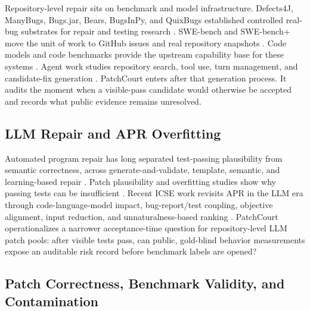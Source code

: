 \documentclass[conference]{IEEEtran}
\newcommand{\patchcourt}{PatchCourt\xspace}
\begin{document}
Repository-level repair sits on benchmark and model infrastructure.
Defects4J, ManyBugs, Bugs.jar, Bears, BugsInPy, and QuixBugs established controlled real-bug substrates for repair and testing research \cite{just2014defects4j,le2015manybugs,saha2018bugsjar,madeiral2019bears,widyasari2020bugsinpy,lin2017quixbugs}.
SWE-bench and SWE-bench+ move the unit of work to GitHub issues and real repository snapshots \cite{jimenez2024swebench,aleithan2024swebenchplus}.
Code models and code benchmarks provide the upstream capability base for these systems \cite{feng2020codebert,lu2021codexglue,chen2021codex,austin2021program,wang2021codet5,li2022alphacode,nijkamp2023codegen,roziere2023codellama,guo2024deepseekcoder}.
Agent work studies repository search, tool use, turn management, and candidate-fix generation \cite{yang2024sweagent,zhang2024autocoderover,bouzenia2025repairagent,xia2024agentless,gao2026moreless,tian2026ensemble}.
\patchcourt enters after that generation process.
It audits the moment when a visible-pass candidate would otherwise be accepted and records what public evidence remains unresolved.

\subsection{LLM Repair and APR Overfitting}

Automated program repair has long separated test-passing plausibility from semantic correctness, across generate-and-validate, template, semantic, and learning-based repair \cite{weimer2009genprog,legoues2012systematic,kim2013par,nguyen2013semfix,long2016prophet,mechtaev2016angelix,xuan2017nopol,tufano2019learning,lutellier2020coconut,jiang2021cure,zhu2021recoder,xia2022less,xia2023conversational}.
Patch plausibility and overfitting studies show why passing tests can be insufficient \cite{qi2015plausibility,smith2015overfitting,ye2021automated,gazzola2019survey}.
Recent ICSE work revisits APR in the LLM era through code-language-model impact, bug-report/test coupling, objective alignment, input reduction, and unnaturalness-based ranking \cite{jiang2023impact,motwani2023better,xu2025aligning,yang2026inputreduction,yang2025unnaturalness}.
\patchcourt operationalizes a narrower acceptance-time question for repository-level LLM patch pools: after visible tests pass, can public, gold-blind behavior measurements expose an auditable risk record before benchmark labels are opened?

\subsection{Patch Correctness, Benchmark Validity, and Contamination}
\end{document}

